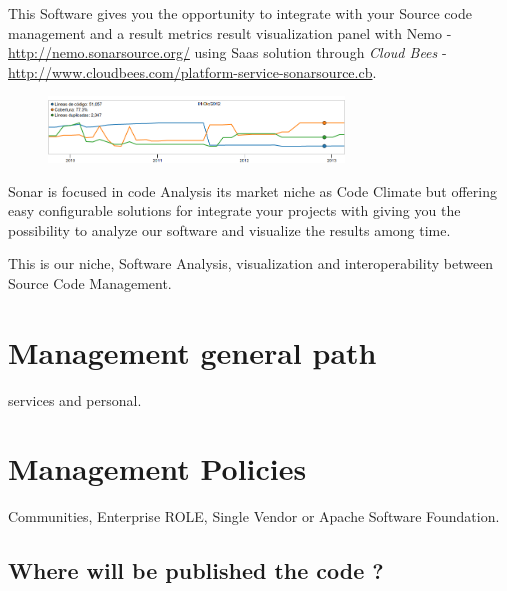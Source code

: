\documentclass[11pt]{scrartcl}
\begin{document}
\par This Software gives you the opportunity to integrate with your Source code management and a result metrics result visualization panel with Nemo - \url{http://nemo.sonarsource.org/} using Saas solution through \emph{Cloud Bees} - \url{http://www.cloudbees.com/platform-service-sonarsource.cb}.

\begin{figure}[H]
\centering
\includegraphics[width=0.7\textwidth]{nemo-evolution.png}
\caption{}
\label{}
\end{figure}

\par Sonar is focused in code Analysis its market niche as Code Climate but offering easy configurable solutions for integrate your projects with giving you the possibility to analyze our software and visualize the results among time.

\par This is our niche, Software Analysis, visualization and interoperability between Source Code Management.


\section{Management general path}
\label{sec:management-path}

\par services and personal.


\section{Management Policies}
\label{sec:management-policies}

\par Communities, Enterprise ROLE, Single Vendor or Apache Software Foundation.

\subsection{Where will be published the code ?}
\label{sub:publish-code}
\end{document}

